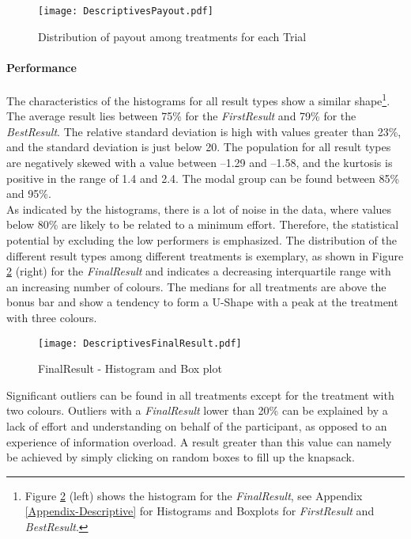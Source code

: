  \begin{figure}[htbp] %
\begin{center} 
  \caption{Distribution of payout among treatments for each Trial}
    \label{Distributionofpayout}
  \texttt{[image: DescriptivesPayout.pdf]}
\end{center}
\end{figure}
\paragraph{Performance}
\label{ch:Evaluation:sec:DescriptiveStatistics:subsec:Performance}
The characteristics of the histograms for all result types show a similar shape\footnote{Figure \ref{DistributionFinalResult} (left) shows the histogram for the \textit{FinalResult}, see Appendix \ref{Appendix-Descriptive} for Histograms and Boxplots for \textit{FirstResult} and \textit{BestResult}.}. The average result lies between 75\% for the \textit{FirstResult} and 79\% for the \textit{BestResult}. The relative standard deviation is high with values greater than 23\%, and the standard deviation is just below 20. 
The population for all result types are negatively skewed with a value between --1.29 and --1.58, and the kurtosis is positive in the range of 1.4 and 2.4. The modal group can be found between 85\% and 95\%.\\
As indicated by the histograms, there is a lot of noise in the data, where values below 80\% are likely to be related to a minimum effort. Therefore, the statistical potential by excluding the low performers is emphasized.
The distribution of the different result types among different treatments is exemplary, as shown in Figure \ref{DistributionFinalResult} (right) for the \textit{FinalResult} and indicates a decreasing interquartile range with an increasing number of colours. The medians for all treatments are above the bonus bar and show a tendency to form a U-Shape with a peak at the treatment with three colours.\\
\begin{figure}[htbp] %
\begin{center} 
  \texttt{[image: DescriptivesFinalResult.pdf]}
  \caption{FinalResult - Histogram and Box plot}
    \label{DistributionFinalResult} 
\end{center}
\end{figure}
Significant outliers can be found in all treatments except for the treatment with two colours. Outliers with a \textit{FinalResult} lower than 20\% can be explained by a lack of effort and understanding on behalf of the participant, as opposed to an experience of information overload. A result greater than this value can namely be achieved by simply clicking on random boxes to fill up the knapsack.

